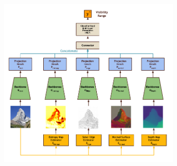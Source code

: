 \begin{figure}
    \centering
    \begin{subfigure}[b]{0.64\textwidth}
        \includegraphics[width=\textwidth]{imgs/SeeNN_Expanded.pdf}
    \caption{}
    \end{subfigure}
    \begin{subfigure}[b]{0.2\textwidth}

\end{subfigure}
\end{figure}
